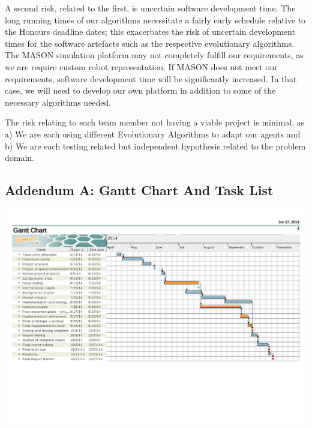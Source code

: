 \documentclass[a4paper,12pt]{article}
\begin{document}
A second risk, related to the first, is uncertain software development time. The long running times of our algorithms necessitate a fairly early schedule relative to the Honours deadline dates; this exacerbates the risk of uncertain development times for the software artefacts such as the respective evolutionary algorithms. The MASON simulation platform may not completely fulfill our requirements, as we are require custom robot representation. If MASON does not meet our requirements, software development time will be significantly increased. In that case, we will need to develop our own platform in addition to some of the necessary algorithms needed.

The risk relating to each team member not having a viable project is minimal, as a) We are each using different Evolutionary Algorithms to adapt our agents and b) We are each testing related but independent hypothesis related to the problem domain.



\begin{landscape}
\appendix
\section{Addendum A: Gantt Chart And Task List}
\centering
\includegraphics[scale=0.3]{ganttchart}
\end{landscape}
\end{document}
